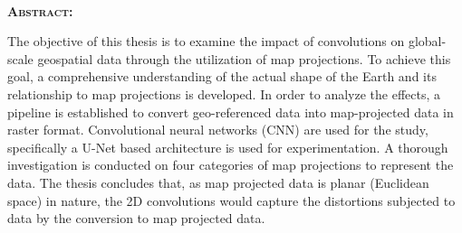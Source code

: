 % 
% 
% 

\newpage

\clearpage
\cleardoublepage
{}

\pagestyle{plain}

{}

{\noindent \large \textbf{\thesisTitle}}\\




{\noindent \textbf{\textsc{Abstract:}}}

\noindent The objective of this thesis is to examine the impact of convolutions on global-scale geospatial data through the utilization of map projections.
To achieve this goal, a comprehensive understanding of the actual shape of the Earth and its relationship to map projections is developed.
In order to analyze the effects, a pipeline is established to convert geo-referenced data into map-projected data in raster format.
Convolutional neural networks (CNN) are used for the study, specifically a U-Net based architecture is used for experimentation.
A thorough investigation is conducted on four categories of map projections to represent the data.
The thesis concludes that, as map projected data is planar (Euclidean space) in nature,
the 2D convolutions would capture the distortions subjected to data by the conversion to map projected data.